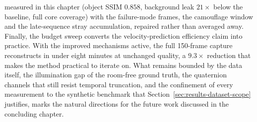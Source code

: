 measured in this chapter (object SSIM $0.858$, background leak $21\times$ below the
baseline, full core coverage) with the failure-mode frames, the camouflage window and
the late-sequence stray accumulation, repaired rather than averaged away. Finally, the
budget sweep converts the velocity-prediction efficiency claim into practice. With
the improved mechanisms active, the full 150-frame capture reconstructs in under
eight minutes at unchanged quality, a $9.3\times$ reduction that makes the method
practical to iterate on. What remains bounded by the data itself, the illumination
gap of the room-free ground truth, the quaternion channels that still resist
temporal truncation, and the confinement of every measurement to the synthetic
benchmark that Section~\ref{sec:results-dataset-scope} justifies, marks the
natural directions for the future work discussed in the concluding chapter.
